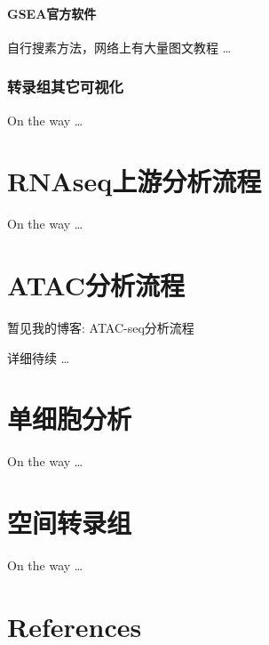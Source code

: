 \documentclass[
]{book}
\begin{document}
\subsubsection{GSEA官方软件}\label{gseaux5b98ux65b9ux8f6fux4ef6}

自行搜素方法，网络上有大量图文教程 \ldots{}

\subsection{转录组其它可视化}\label{visual}

On the way \ldots{}

\chapter{RNAseq上游分析流程}\label{rnaseq-rsubread}

On the way \ldots{}

\chapter{ATAC分析流程}\label{cuttag}

暂见我的博客: ATAC-seq分析流程

详细待续 \ldots{}

\chapter{单细胞分析}\label{scRNA}

On the way \ldots{}

\chapter{空间转录组}\label{spatial}

On the way \ldots{}

\chapter*{References}\label{references}

  
\end{document}
